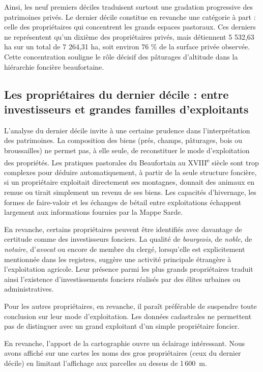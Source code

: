 \documentclass[12pt,a4paper]{report}
\begin{document}
	Ainsi, les neuf premiers déciles traduisent surtout une gradation progressive des patrimoines privés. Le dernier décile constitue en revanche une catégorie à part : celle des propriétaires qui concentrent les grands espaces pastoraux. Ces derniers ne représentent qu'un dixième des propriétaires privés, mais détiennent 5 532,63 ha sur un total de 7 264,31 ha, soit environ 76 \% de la surface privée observée. Cette concentration souligne le rôle décisif des pâturages d'altitude dans la hiérarchie foncière beaufortaine.
	
	\subsection{Les propriétaires du dernier décile : entre investisseurs et grandes familles d'exploitants}
	
	L'analyse du dernier décile invite à une certaine prudence dans l'interprétation des patrimoines. La composition des biens (prés, champs, pâturages, bois ou broussailles) ne permet pas, à elle seule, de reconstituer le mode d'exploitation des propriétés. Les pratiques pastorales du Beaufortain au XVIII\textsuperscript{e} siècle sont trop complexes pour déduire automatiquement, à partir de la seule structure foncière, si un propriétaire exploitait directement ses montagnes, donnait des animaux en remue ou tirait simplement un revenu de ses biens. Les capacités d'hivernage, les formes de faire-valoir et les échanges de bétail entre exploitations échappent largement aux informations fournies par la Mappe Sarde.
	
	En revanche, certains propriétaires peuvent être identifiés avec davantage de certitude comme des investisseurs fonciers. La qualité de \textit{bourgeois}, de \textit{noble}, de \textit{notaire}, d'\textit{avocat} ou encore de membre du clergé, lorsqu'elle est explicitement mentionnée dans les registres, suggère une activité principale étrangère à l'exploitation agricole. Leur présence parmi les plus grands propriétaires traduit ainsi l'existence d'investissements fonciers réalisés par des élites urbaines ou administratives.
	
	Pour les autres propriétaires, en revanche, il paraît préférable de suspendre toute conclusion sur leur mode d'exploitation. Les données cadastrales ne permettent pas de distinguer avec un grand exploitant d'un simple propriétaire foncier.
	
	En revanche, l'apport de la cartographie ouvre un éclairage intéressant. Nous avons affiché sur une cartes les noms des  gros propriétaires (ceux du dernier décile) en limitant l'affichage aux parcelles au dessus de  1\,600~m. 
	
\end{document}

